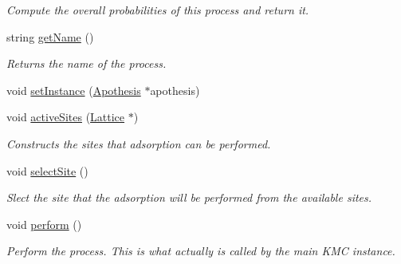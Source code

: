 \begin{DoxyCompactItemize}
\begin{DoxyCompactList}\small\item\em Compute the overall probabilities of this process and return it. \end{DoxyCompactList}\item 
\mbox{\label{classMicroProcesses_1_1Adsorption_a1c94a7d3b64f9c60ae72879ef0b50cc2}} 
string \mbox{\hyperlink{classMicroProcesses_1_1Adsorption_a1c94a7d3b64f9c60ae72879ef0b50cc2}{get\+Name}} ()
\begin{DoxyCompactList}\small\item\em Returns the name of the process. \end{DoxyCompactList}\item 
void \mbox{\hyperlink{classMicroProcesses_1_1Adsorption_a5faf57ecabf9d2de92d4e630593771d3}{set\+Instance}} (\mbox{\hyperlink{classApothesis}{Apothesis}} $\ast$apothesis)
\item 
\mbox{\label{classMicroProcesses_1_1Adsorption_a42e317856d4e97770d456bf9568cb73d}} 
void \mbox{\hyperlink{classMicroProcesses_1_1Adsorption_a42e317856d4e97770d456bf9568cb73d}{active\+Sites}} (\mbox{\hyperlink{classLattice}{Lattice}} $\ast$)
\begin{DoxyCompactList}\small\item\em Constructs the sites that adsorption can be performed. \end{DoxyCompactList}\item 
\mbox{\label{classMicroProcesses_1_1Adsorption_af20402b5bfbc7b627ad8de13bdc2c541}} 
void \mbox{\hyperlink{classMicroProcesses_1_1Adsorption_af20402b5bfbc7b627ad8de13bdc2c541}{select\+Site}} ()
\begin{DoxyCompactList}\small\item\em Slect the site that the adsorption will be performed from the available sites. \end{DoxyCompactList}\item 
\mbox{\label{classMicroProcesses_1_1Adsorption_af67f833e6d63a35ac7c619997350e24c}} 
void \mbox{\hyperlink{classMicroProcesses_1_1Adsorption_af67f833e6d63a35ac7c619997350e24c}{perform}} ()
\begin{DoxyCompactList}\small\item\em Perform the process. This is what actually is called by the main K\+MC instance. \end{DoxyCompactList}\item 

\end{DoxyCompactItemize}
